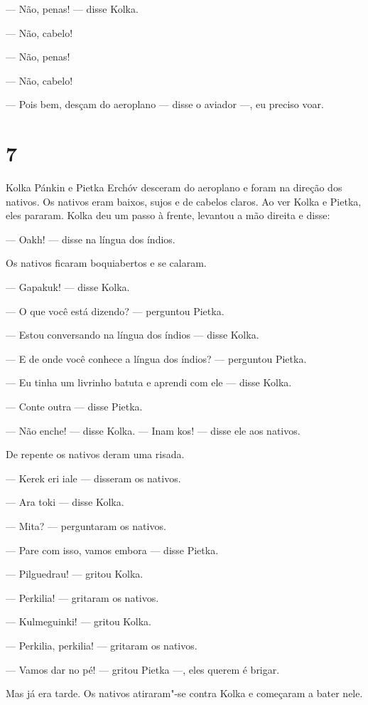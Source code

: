 --- Não, penas! --- disse Kolka.

--- Não, cabelo!

--- Não, penas!

--- Não, cabelo!

--- Pois bem, desçam do aeroplano --- disse o aviador ---, eu preciso
voar.

\section{7}

Kolka Pánkin e Pietka Erchóv desceram do aeroplano e foram na direção
dos nativos. Os nativos eram baixos, sujos e de cabelos claros. Ao ver
Kolka e Pietka, eles pararam. Kolka deu um passo à frente,
levantou a mão direita e disse:

--- Oakh! --- disse na língua dos índios.

Os nativos ficaram boquiabertos e se calaram.

--- Gapakuk! --- disse Kolka.

--- O que você está dizendo? --- perguntou Pietka.

--- Estou conversando na língua dos índios --- disse Kolka.

--- E de onde você conhece a língua dos índios? --- perguntou Pietka.

--- Eu tinha um livrinho batuta e aprendi com ele --- disse Kolka.

--- Conte outra --- disse Pietka.

--- Não enche! --- disse Kolka. --- Inam kos! --- disse ele aos
nativos.

De repente os nativos deram uma risada.

--- Kerek eri iale --- disseram os nativos.

--- Ara toki --- disse Kolka.

--- Mita? --- perguntaram os nativos.

--- Pare com isso, vamos embora --- disse Pietka.

--- Pilguedrau! --- gritou Kolka.

--- Perkilia! --- gritaram os nativos.

--- Kulmeguinki! --- gritou Kolka.

--- Perkilia, perkilia! --- gritaram os nativos.

--- Vamos dar no pé! --- gritou Pietka ---, eles querem é brigar.

Mas já era tarde. Os nativos atiraram"-se contra Kolka e começaram a
bater nele.


